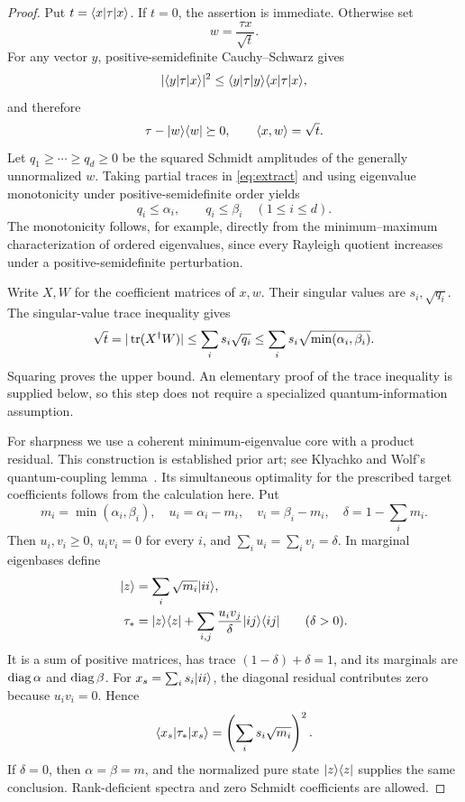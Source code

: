 \begin{proof}
Put $t=\langle x\rvert\tau\lvert x\rangle$. If $t=0$, the assertion is immediate. Otherwise set
\[
 w=\frac{\tau x}{\sqrt t}.
\]
For any vector $y$, positive-semidefinite Cauchy--Schwarz gives
\[
 |\langle y\rvert\tau\lvert x\rangle|^2\le\langle y\rvert\tau\lvert y\rangle\langle x\rvert\tau\lvert x\rangle,
\]
and therefore
\begin{equation}\label{eq:extract}
 \tau-\lvert w\rangle\langle w\rvert\succeq0,\qquad\langle x,w\rangle=\sqrt t.
\end{equation}
Let $q_1\ge\cdots\ge q_d\ge0$ be the squared Schmidt amplitudes of the generally unnormalized $w$. Taking partial traces in \eqref{eq:extract} and using eigenvalue monotonicity under positive-semidefinite order yields
\[
 q_i\le\alpha_i,\qquad q_i\le\beta_i\quad(1\le i\le d).
\]
The monotonicity follows, for example, directly from the minimum--maximum characterization of ordered eigenvalues, since every Rayleigh quotient increases under a positive-semidefinite perturbation.

Write $X,W$ for the coefficient matrices of $x,w$. Their singular values are $s_i,\sqrt{q_i}$. The singular-value trace inequality gives
\[
 \sqrt t=|\operatorname{tr}(X^\dagger W)|\le\sum_i s_i\sqrt{q_i}
 \le\sum_i s_i\sqrt{\min(\alpha_i,\beta_i)}.
\]
Squaring proves the upper bound. An elementary proof of the trace inequality is supplied below, so this step does not require a specialized quantum-information assumption.

For sharpness we use a coherent minimum-eigenvalue core with a product residual. This construction is established prior art; see Klyachko and Wolf's quantum-coupling lemma~\cite{klyachko,wolf}. Its simultaneous optimality for the prescribed target coefficients follows from the calculation here. Put
\[
 m_i=\min(\alpha_i,\beta_i),\quad
 u_i=\alpha_i-m_i,\quad v_i=\beta_i-m_i,\quad
 \delta=1-\sum_i m_i.
\]
Then $u_i,v_i\ge0$, $u_iv_i=0$ for every $i$, and $\sum_i u_i=\sum_i v_i=\delta$. In marginal eigenbases define
\begin{align}\label{eq:coherent-min}
 \lvert z\rangle&=\sum_i\sqrt{m_i}\lvert ii\rangle,\\
 \tau_*&=\lvert z\rangle\langle z\rvert+
 \sum_{i,j}\frac{u_iv_j}{\delta}\lvert ij\rangle\langle ij\rvert
 \qquad(\delta>0).
\end{align}
It is a sum of positive matrices, has trace $(1-\delta)+\delta=1$, and its marginals are $\operatorname{diag}\alpha$ and $\operatorname{diag}\beta$. For $x_s=\sum_i s_i\lvert ii\rangle$, the diagonal residual contributes zero because $u_iv_i=0$. Hence
\[
 \langle x_s\rvert\tau_*\lvert x_s\rangle=\left(\sum_i s_i\sqrt{m_i}\right)^2.
\]
If $\delta=0$, then $\alpha=\beta=m$, and the normalized pure state $\lvert z\rangle\langle z\rvert$ supplies the same conclusion. Rank-deficient spectra and zero Schmidt coefficients are allowed.
\end{proof}

